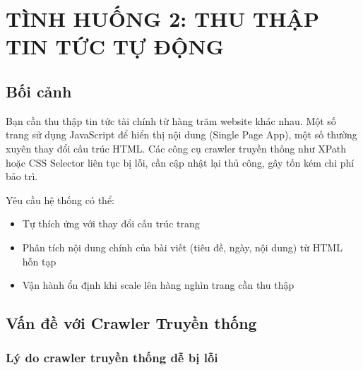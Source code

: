 
\section{TÌNH HUỐNG 2: THU THẬP TIN TỨC TỰ ĐỘNG}

\subsection{Bối cảnh}

Bạn cần thu thập tin tức tài chính từ hàng trăm website khác nhau. Một số trang sử dụng JavaScript để hiển thị nội dung (Single Page App), một số thường xuyên thay đổi cấu trúc HTML. Các công cụ crawler truyền thống như XPath hoặc CSS Selector liên tục bị lỗi, cần cập nhật lại thủ công, gây tốn kém chi phí bảo trì.

Yêu cầu hệ thống có thể:
\begin{itemize}
    \item Tự thích ứng với thay đổi cấu trúc trang
    \item Phân tích nội dung chính của bài viết (tiêu đề, ngày, nội dung) từ HTML hỗn tạp
    \item Vận hành ổn định khi scale lên hàng nghìn trang cần thu thập
\end{itemize}

\subsection{Vấn đề với Crawler Truyền thống}

\subsubsection{Lý do crawler truyền thống dễ bị lỗi}

